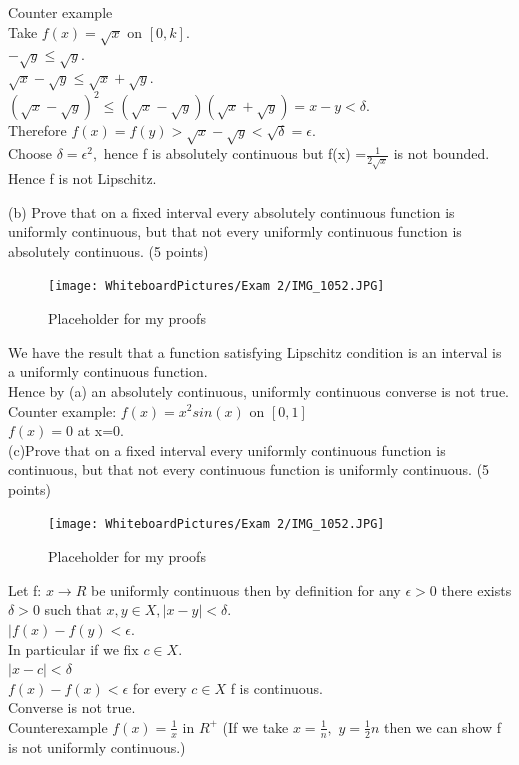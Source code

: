Counter example \\ 
Take $f(x)= \sqrt{x}$ on $[0,k].$ \\ 
$-\sqrt{y} \leq \sqrt{y}.$ \\ 
$\sqrt{x}- \sqrt{y} \leq \sqrt{x} +\sqrt{y}.$ \\ 
$(\sqrt{x}-\sqrt{y})^2 \leq (\sqrt{x}-\sqrt{y})(\sqrt{x}+\sqrt{y})=x-y<\delta.$ \\ 
Therefore $f(x)=f(y)> \sqrt{x}-\sqrt{y}< \sqrt{\delta}= \epsilon.$ \\ 
Choose $\delta=\epsilon^2,$ hence f is absolutely continuous but f(x) =$\frac{1}{2 \sqrt{x}}$ is not bounded. Hence f is not Lipschitz. 

\newpage 
(b) Prove that on a fixed interval every absolutely continuous function is uniformly continuous, but that not every uniformly continuous function is absolutely continuous.  (5 points) 


\begin{figure}[h]\begin{center}\texttt{[image: WhiteboardPictures/Exam 2/IMG\_1052.JPG]}
\caption{Placeholder for my proofs} \label{fig:Euler_pic}\end{center}\end{figure} 

We have the result that a function satisfying Lipschitz condition is an interval is a uniformly continuous function. \\ 
Hence by (a) an absolutely continuous, uniformly continuous converse is not true. \\ 
Counter example: $f(x)=x^2sin(x)$ on $[0,1]$ \\ 
$f(x)=0$ at x=0. \\


(c)Prove that on a fixed interval every uniformly continuous function is continuous, but that not every continuous function is uniformly continuous.  (5 points) \\ 

\begin{figure}[h]\begin{center}\texttt{[image: WhiteboardPictures/Exam 2/IMG\_1052.JPG]}
\caption{Placeholder for my proofs} \label{fig:Euler_pic}\end{center}\end{figure} 

Let f: $x \longrightarrow R$ be uniformly continuous then  by definition for any $\epsilon>0$ there exists $\delta>0$ such that $x,y \in X, |x-y|<\delta.$ \\ 
$|f(x)-f(y)<\epsilon.$ \\ 
In particular if we fix $c \in X.$ \\ 
$|x-c|<\delta$ \\ 
$f(x)-f(x)< \epsilon$ for every $c \in X$ f is continuous. \\ 
Converse is not true. \\ 
Counterexample $f(x)=\frac{1}{x}$ in $R^+$ (If we take $x= \frac{1}{n},$ $y=\frac{1}{2}n$ then we can show f is not uniformly continuous.)



